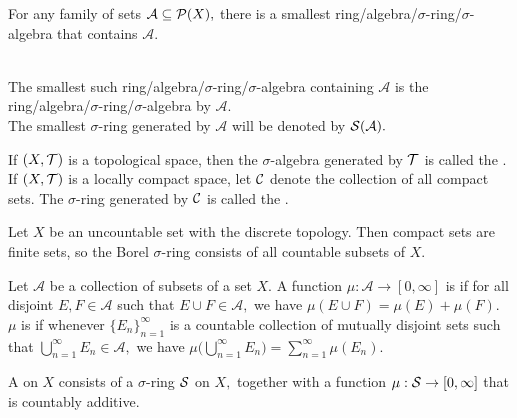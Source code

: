 \begin{prop}
For any family of sets $\mathcal{A}\subseteq\mathcal{P}(X),$ there is a smallest ring/algebra/$\sigma$-ring/$\sigma$-algebra that contains $\mathcal{A}.$ \\ \\
\end{prop}

\noindent The smallest such ring/algebra/$\sigma$-ring/$\sigma$-algebra containing $\mathcal{A}$ is the ring/algebra/$\sigma$-ring/$\sigma$-algebra  by $\mathcal{A}.$ \\ The smallest $\sigma$-ring generated by $\mathcal{A}$ will be denoted by $\mathcal{S}(\mathcal{A}).$

\begin{defn}
If $(X,\mathcal{T})$ is a topological space, then the $\sigma$-algebra generated by $\mathcal{T}$ is called the . \\
If $(X,\mathcal{T})$ is a locally compact space, let $\mathcal{C}$ denote the collection of all compact sets. The $\sigma$-ring generated by $\mathcal{C}$ is called the .
\end{defn}

\noindent\Ex Let $X$ be an uncountable set with the discrete topology. Then compact sets are finite sets, so the Borel $\sigma$-ring consists of all countable subsets of $X.$

\begin{defn}
Let $\mathcal{A}$ be a collection of subsets of a set $X.$ A function $\mu:\mathcal{A}\rightarrow [0,\infty]$ is  if for all disjoint $E,F\in\mathcal{A}$ such that $E\cup F\in\mathcal{A},$ we have $\mu(E\cup F)=\mu(E)+\mu(F).$ \\
$\mu$ is  if whenever $\{E_n\}_{n=1}^{\infty}$ is a countable collection of mutually disjoint sets such that $\bigcup\limits_{n=1}^{\infty} E_n\in\mathcal{A},$ we have $\mu\Big(\bigcup_{n=1}^{\infty} E_n\Big)=\sum\limits_{n=1}^{\infty}\mu(E_n).$
\end{defn}

\begin{defn}
A  on $X$ consists of a $\sigma$-ring $\mathcal{S}$ on $X,$ together with a function $\mu:\mathcal{S}\rightarrow[0,\infty]$ that is countably additive.
\end{defn}

